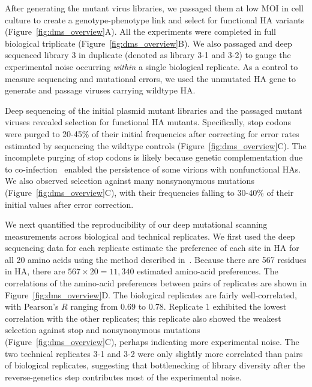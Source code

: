 \documentclass[9pt,twocolumn,twoside]{pnas-new}
\begin{document}
After generating the mutant virus libraries, we passaged them at low MOI in cell culture to create a genotype-phenotype link and select for functional HA variants (Figure~\ref{fig:dms_overview}A).
All the experiments were completed in full biological triplicate (Figure~\ref{fig:dms_overview}B). 
We also passaged and deep sequenced library 3 in duplicate (denoted as library 3-1 and 3-2) to gauge the experimental noise occurring \textit{within} a single biological replicate.
As a control to measure sequencing and mutational errors, we used the unmutated HA gene to generate and passage viruses carrying wildtype HA.

Deep sequencing of the initial plasmid mutant libraries and the passaged mutant viruses revealed selection for functional HA mutants.
Specifically, stop codons were purged to 20-45\% of their initial frequencies after correcting for error rates estimated by sequencing the wildtype controls (Figure~\ref{fig:dms_overview}C).
The incomplete purging of stop codons is likely because genetic complementation due to co-infection~\cite{marshall2013influenza} enabled the persistence of some virions with nonfunctional HAs. 
We also observed selection against many nonsynonymous mutations (Figure~\ref{fig:dms_overview}C), with their frequencies falling to 30-40\% of their initial values after error correction.

We next quantified the reproducibility of our deep mutational scanning measurements across biological and technical replicates. 
We first used the deep sequencing data for each replicate estimate the preference of each site in HA for all 20 amino acids using the method described in~\cite{bloom2015software}.
Because there are 567 residues in HA, there are $567 \times 20 = 11,340$ estimated amino-acid preferences.
The correlations of the amino-acid preferences between pairs of replicates are shown in Figure~\ref{fig:dms_overview}D.
The biological replicates are fairly well-correlated, with Pearson's $R$ ranging from 0.69 to 0.78. 
Replicate 1 exhibited the lowest correlation with the other replicates; this replicate also showed the weakest selection against stop and nonsynonymous mutations (Figure~\ref{fig:dms_overview}C), perhaps indicating more experimental noise.
The two technical replicates 3-1 and 3-2 were only slightly more correlated than pairs of biological replicates, suggesting that bottlenecking of library diversity after the reverse-genetics step contributes most of the experimental noise.
\end{document}
